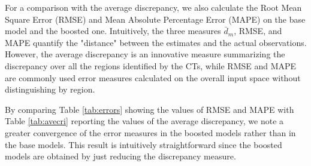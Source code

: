 \documentclass[fleqn,10pt]{wlscirep}
\begin{document}
For a comparison with the average discrepancy, we also calculate the Root Mean Square Error (RMSE) and Mean Absolute Percentage Error (MAPE) on the base model and the boosted one. Intuitively, the three measures $\bar{d}_m$, RMSE, and MAPE quantify the "distance" between the estimates and the actual observations. 
However, the average discrepancy is an innovative measure summarizing the discrepancy over all the regions identified by the CTs, while RMSE and MAPE are commonly used error measures calculated on the overall input space without distinguishing by region. 

By comparing Table \ref{tab:errors} showing the values of RMSE and MAPE with Table \ref{tab:avecri} reporting the values of the average discrepancy, we note a greater convergence of the error measures in the boosted models rather than in the base models. This result is intuitively straightforward since the boosted models are obtained by just reducing the discrepancy measure. 
%
\end{document}
